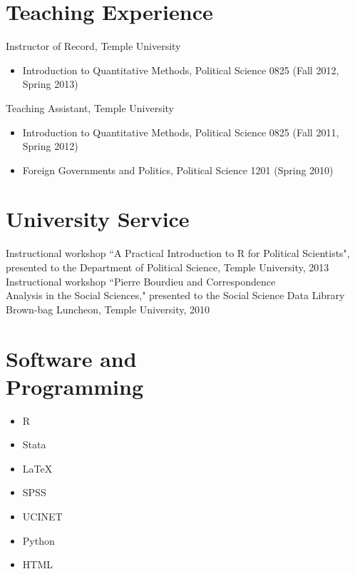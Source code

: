 \documentclass[margin, 12pt]{res} %
\begin{document}
\begin{resume}

\section{Teaching Experience} 

Instructor of Record, Temple University\\
\begin{itemize}
\item Introduction to Quantitative Methods, Political Science 0825 (Fall 2012, Spring 2013)
\end{itemize}
Teaching Assistant, Temple University\\
\begin{itemize}
\item Introduction to Quantitative Methods, Political Science 0825 (Fall 2011, Spring 2012)
\item Foreign Governments and Politics, Political Science 1201 (Spring 2010)
\end{itemize}
 

\section{University Service}
Instructional workshop ``A Practical Introduction to R for Political Scientists",
presented to the Department of Political Science, Temple University, 2013 \vspace{3 mm}  \\
Instructional workshop ``Pierre Bourdieu and Correspondence \\ Analysis in the Social Sciences,"
presented to the Social Science Data Library Brown-bag Luncheon, Temple University, 2010


\section{Software and\\ Programming} 
\begin{itemize}
\item R
\item Stata
\item \LaTeX 
\item SPSS
\item UCINET
\item Python
\item HTML \\
\end{itemize}



\end{resume}
\end{document}
